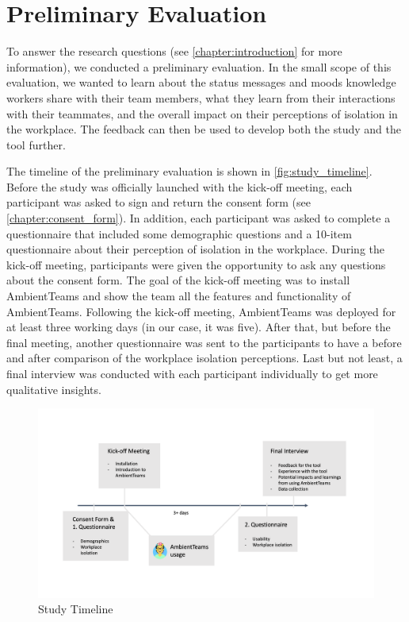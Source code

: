 \chapter{Preliminary Evaluation}
\label{chapter:preliminary_evaluation}
To answer the research questions (see \autoref{chapter:introduction} for more information), we conducted a preliminary evaluation. In the small scope of this evaluation, we wanted to learn about the status messages and moods knowledge workers share with their team members, what they learn from their interactions with their teammates, and the overall impact on their perceptions of isolation in the workplace. The feedback can then be used to develop both the study and the tool further.

The timeline of the preliminary evaluation is shown in \autoref{fig:study_timeline}. Before the study was officially launched with the kick-off meeting, each participant was asked to sign and return the consent form (see \autoref{chapter:consent_form}). In addition, each participant was asked to complete a questionnaire that included some demographic questions and a 10-item questionnaire about their perception of isolation in the workplace. During the kick-off meeting, participants were given the opportunity to ask any questions about the consent form. The goal of the kick-off meeting was to install AmbientTeams and show the team all the features and functionality of AmbientTeams. Following the kick-off meeting, AmbientTeams was deployed for at least three working days (in our case, it was five). After that, but before the final meeting, another questionnaire was sent to the participants to have a before and after comparison of the workplace isolation perceptions. Last but not least, a final interview was conducted with each participant individually to get more qualitative insights.

\begin{figure}[h]
    \centering
    \includegraphics[width=\linewidth]{./images/Study_Timeline.png}
    \caption{Study Timeline}
    \label{fig:study_timeline}
\end{figure}


